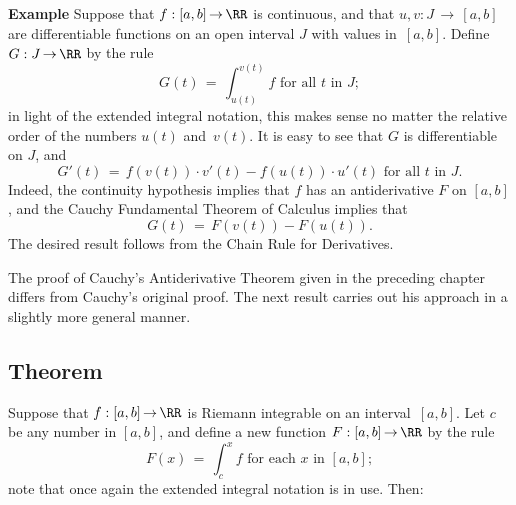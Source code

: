         {\bf Example} Suppose that $f:[a,b] \,{\rightarrow}\, {\RR}$ is continuous, and that $u,v:J \,{\rightarrow}\, [a,b]$ are differentiable functions on an open interval $J$ with values in~$[a,b]$.
    Define $G:J \,{\rightarrow}\, {\RR}$ by the rule
        \begin{displaymath}
        G(t) \,=\, \int_{u(t)}^{v(t)} f \mbox{ for all $t$ in $J$};
        \end{displaymath}
    in light of the extended integral notation, this makes sense no matter the relative order of the numbers $u(t)$ and~$v(t)$.
     It is easy to see that $G$ is differentiable on $J$, and
        \begin{displaymath}
        G'(t) \,=\, f(v(t)){\cdot}v'(t) - f(u(t)){\cdot}u'(t) \mbox{ for all $t$ in $J$}.
        \end{displaymath}
    Indeed, the continuity hypothesis implies that $f$ has an antiderivative $F$ on $[a,b]$, and the Cauchy Fundamental Theorem of Calculus implies that
        \begin{displaymath}
        G(t) \,=\, F(v(t)) - F(u(t)).
        \end{displaymath}
    The desired result follows from the Chain Rule for Derivatives.


\VV

        The proof of Cauchy's Antiderivative Theorem given in the preceding chapter differs from Cauchy's original proof.
    The next result carries out his approach in a slightly more general manner.

\V

        \subsection{\small{{\bf Theorem}}}%
        \label{ThmH40.20}

\V

        Suppose that $f:[a,b] \,{\rightarrow}\, {\RR}$ is Riemann integrable on an interval~$[a,b]$.
    Let $c$ be any number in $[a,b]$, and define a new function $F:[a,b] \,{\rightarrow}\, {\RR}$ by the rule
        \begin{displaymath}
        F(x) \,=\, \int_{c}^{x} f \mbox{ for each $x$ in $[a,b]$};
        \end{displaymath}
    note that once again the extended integral notation is in use. Then:

\V

